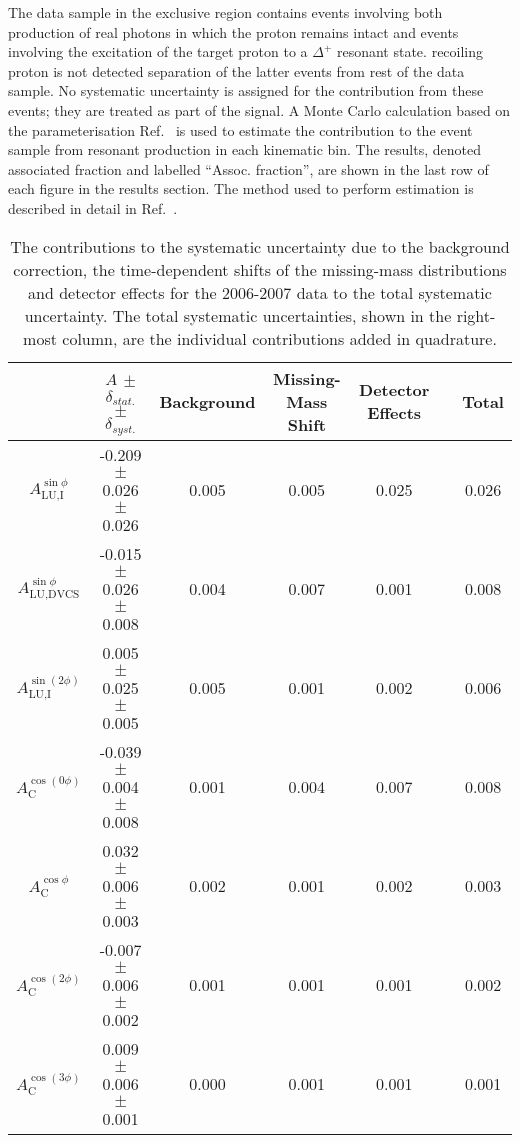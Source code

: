 The data sample in the exclusive region contains events involving both
production of real photons in which the proton remains intact and
events involving the excitation of the target proton to a $\Delta^+$
resonant state.  recoiling proton is not detected  separation of the latter events from rest of the data sample.
No systematic uncertainty is assigned for the contribution from these events; they are treated as part of the signal. A Monte Carlo calculation based on the parameterisation  Ref.~\cite{Bra76} is used to estimate the contribution to the event sample from resonant production in each kinematic bin. The results, denoted associated fraction and labelled ``Assoc. fraction'', are shown in the last row of each figure in the results section. The method used to perform  estimation is described in detail in
Ref.~\cite{Air08}.

\begin{table}
 \begin{center}
\resizebox{16cm}{!} {
 \begin{tabular}{|c|c|c|c|c|c|c|}
  \hline
 & $A$ $\pm$ $\delta_{stat.}$ $\pm$ $\delta_{syst.}$ & Background & Missing-Mass Shift & Detector Effects & & Total \\
  \hline
  \hline
  $A_{\textrm{LU,I}}^{\sin\phi}$ & -0.209  $\pm$  0.026  $\pm$   0.026 & 0.005 & 0.005 & 0.025 & & 0.026 \\
  \hline
  $A_{\textrm{LU,DVCS}}^{\sin\phi}$ & -0.015  $\pm$  0.026  $\pm$  0.008 & 0.004 & 0.007 & 0.001 & & 0.008 \\
  \hline
  $A_{\textrm{LU,I}}^{\sin(2\phi)}$ & 0.005  $\pm$  0.025  $\pm$   0.005 & 0.005 & 0.001 & 0.002 & & 0.006 \\
  \hline
  \hline
  $A_{\textrm{C}}^{\cos(0\phi)}$ & -0.039 $\pm$  0.004 $\pm$  0.008 & 0.001 & 0.004 & 0.007 & & 0.008 \\
  \hline
  $A_{\textrm{C}}^{\cos\phi}$ & 0.032  $\pm$  0.006 $\pm$   0.003 & 0.002 & 0.001 & 0.002 & & 0.003 \\
  \hline
  $A_{\textrm{C}}^{\cos(2\phi)}$ & -0.007  $\pm$  0.006  $\pm$   0.002 & 0.001 & 0.001 & 0.001 & & 0.002 \\
  \hline
  $A_{\textrm{C}}^{\cos(3\phi)}$ & 0.009  $\pm$   0.006   $\pm$   0.001 & 0.000 & 0.001 & 0.001 & & 0.001 \\
  \hline
 \end{tabular}
}
  \caption{The contributions to the systematic uncertainty due to the
background correction, the time-dependent shifts of the missing-mass
distributions and detector effects for the 2006-2007 data to the total
systematic uncertainty. The total systematic uncertainties, shown in the
right-most column, are the individual contributions added in quadrature.}
  \label{table_systematic_contributions_0607}
\end{center}
\end{table}

